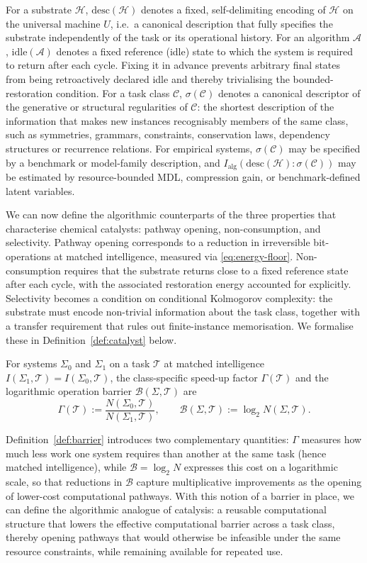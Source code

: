 \documentclass[runningheads]{llncs}
\newcommand{\IntOp}{I}
\newcommand{\Sys}{\Sigma}
\newcommand{\Nop}{N}
\newcommand{\Alg}{\mathcal{A}}
\newcommand{\Hw}{\mathcal{H}}
\newcommand{\Task}{\mathcal{T}}
\newcommand{\Class}{\mathcal{C}}
\newcommand{\Barrier}{\mathcal{B}}
\newcommand{\descop}{\mathrm{desc}}
\newcommand{\idle}{\mathrm{idle}}
\newcommand{\MutInfo}{I_{\mathrm{alg}}}
\begin{document}
For a substrate $\Hw$, $\descop(\Hw)$ denotes a fixed,
self-delimiting encoding of $\Hw$ on the universal machine $U$,
i.e.\ a canonical description that fully specifies the substrate
independently of the task or its operational history. For an algorithm $\Alg$, $\idle(\Alg)$ denotes a fixed
reference (idle) state to which the system is required to return after
each cycle. Fixing it in advance prevents arbitrary final states
from being retroactively declared idle and thereby trivialising
the bounded-restoration condition. For a task class
$\Class$, $\sigma(\Class)$ denotes a canonical descriptor of the
generative or structural regularities of $\Class$: the shortest description of the information that
makes new instances recognisably members of the same class, such as
symmetries, grammars, constraints, conservation laws, dependency
structures or recurrence relations. For empirical systems, \(\sigma(\Class)\) may be specified by a benchmark or model-family description, and \(\MutInfo(\descop(\Hw):\sigma(\Class))\) may be estimated by resource-bounded MDL, compression gain, or benchmark-defined latent variables.

We can now define the algorithmic
counterparts of the three properties that characterise chemical
catalysts: pathway opening, non-consumption, and selectivity.
Pathway opening corresponds to a reduction in irreversible
bit-operations at matched intelligence, measured via
\eqref{eq:energy-floor}. Non-consumption requires that the
substrate returns close to a fixed reference state after each
cycle, with the associated restoration energy accounted for
explicitly. Selectivity becomes a condition on conditional
Kolmogorov complexity: the substrate must encode non-trivial
information about the task class, together with a transfer
requirement that rules out finite-instance memorisation. We formalise these in Definition~\ref{def:catalyst} below.  

\begin{definition}
\label{def:barrier}
For systems $\Sys_0$ and $\Sys_1$ on a task $\Task$ at matched
intelligence $\IntOp(\Sys_1,\Task)=\IntOp(\Sys_0,\Task)$, the
class-specific speed-up factor $\Gamma(\Task)$ and the logarithmic operation barrier $\Barrier(\Sys,\Task)$
are
\begin{equation}
\Gamma(\Task):=\frac{\Nop(\Sys_0,\Task)}{\Nop(\Sys_1,\Task)},
\qquad
\Barrier(\Sys,\Task):=\log_2\Nop(\Sys,\Task).
\end{equation}
\end{definition}
Definition~\ref{def:barrier} introduces two complementary quantities:
$\Gamma$ measures how much less work one system requires than another
at the same task (hence matched intelligence), while $\Barrier=\log_2\Nop$ expresses
this cost on a logarithmic scale, so that reductions in $\Barrier$
capture multiplicative improvements as the opening of lower-cost
computational pathways. With this notion of a barrier in place, we can define the algorithmic analogue of catalysis: a reusable computational structure that lowers
the effective computational barrier across a task class, thereby
opening pathways that would otherwise be infeasible under the same
resource constraints, while remaining available for repeated use.
\end{document}
